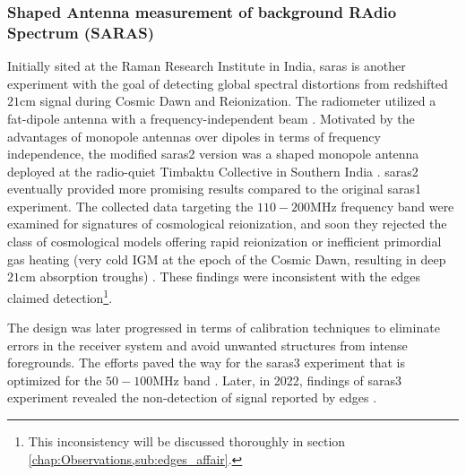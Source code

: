 \documentclass[12pt, TexShade, letterpaper]{report}
\begin{document}
\subsubsection{Shaped Antenna measurement of background RAdio Spectrum (SARAS)} 
Initially sited at the Raman Research Institute in India, \gls{saras} is another experiment with the goal of detecting global spectral distortions from redshifted $\mathrm{21cm}$ signal during Cosmic Dawn and Reionization. The radiometer utilized a fat-dipole antenna with a frequency-independent beam \cite{saras_1}. Motivated by the advantages of monopole antennas over dipoles in terms of frequency independence, the modified \gls{saras}2 version was a shaped monopole antenna deployed at the radio-quiet Timbaktu Collective in Southern India \cite{saras_2}. \gls{saras}2 eventually provided more promising results compared to the original \gls{saras}1 experiment. The collected data targeting the $110-200 \mathrm{MHz}$ frequency band were examined for signatures of cosmological reionization, and soon they rejected the class of cosmological models offering rapid reionization or inefficient primordial gas heating (very cold IGM at the epoch of the Cosmic Dawn, resulting in deep $\mathrm{21cm}$ absorption troughs) \cite{saras_2_constrains, saras_2_results}. These findings were inconsistent with the \gls{edges} claimed detection\footnote{This inconsistency will be discussed thoroughly in section \ref{chap:Observations,sub:edges_affair}.}\cite{dark_ages_space, thesis_shedding, saras_curse_edges}.\par
The design was later progressed in terms of calibration techniques to eliminate errors in the receiver system and avoid unwanted structures from intense foregrounds. The efforts paved the way for the \gls{saras}3 experiment that is optimized for the $50-100 \mathrm{MHz}$ band \cite{saras_3, dark_ages_space}. Later, in 2022, findings of \gls{saras}3 experiment revealed the non-detection of signal reported by \gls{edges} \cite{saras_3_results}.\par
\end{document}
